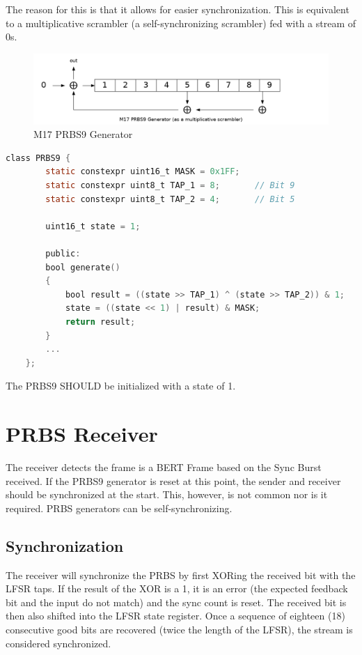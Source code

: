 \documentclass[a4paper,11pt,oneside]{book}
\begin{document}
The reason for this is that it allows for easier synchronization. This is equivalent to a multiplicative scrambler (a self-synchronizing scrambler) fed with a stream of 0s.

\begin{figure}[H]
	\centering
	\includegraphics[width=0.7\linewidth]{img/m17-equivalent-scrambler}
	\caption{M17 PRBS9 Generator}
	\label{fig:m17-equivalent-scrambler}
\end{figure}

\begin{lstlisting}[language=C]
	class PRBS9 {
		static constexpr uint16_t MASK = 0x1FF;
		static constexpr uint8_t TAP_1 = 8;       // Bit 9
		static constexpr uint8_t TAP_2 = 4;       // Bit 5

		uint16_t state = 1;

		public:
		bool generate()
		{
			bool result = ((state >> TAP_1) ^ (state >> TAP_2)) & 1;
			state = ((state << 1) | result) & MASK;
			return result;
		}
		...
	};
\end{lstlisting}

The PRBS9 SHOULD be initialized with a state of 1.

\section{PRBS Receiver}

The receiver detects the frame is a BERT Frame based on the Sync Burst received. If the PRBS9 generator is reset at this point, the sender and receiver should be synchronized at the start. This, however, is not common nor is it required. PRBS generators can be self-synchronizing.

\subsection{Synchronization}

The receiver will synchronize the PRBS by first XORing the received bit with the LFSR taps. If the result of the XOR is a 1, it is an error (the expected feedback bit and the input do not match) and the sync count is reset. The received bit is then also shifted into the LFSR state register. Once a sequence of eighteen (18) consecutive good bits are recovered (twice the length of the LFSR), the stream is considered synchronized.
\end{document}
